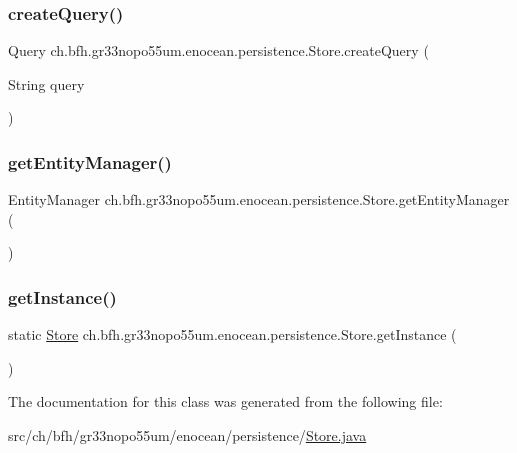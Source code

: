 \subsubsection{\texorpdfstring{create\+Query()}{createQuery()}}
{\footnotesize\ttfamily Query ch.\+bfh.\+gr33nopo55um.\+enocean.\+persistence.\+Store.\+create\+Query (\begin{DoxyParamCaption}\item[{String}]{query }\end{DoxyParamCaption})}

\hypertarget{classch_1_1bfh_1_1gr33nopo55um_1_1enocean_1_1persistence_1_1_store_a198b406b1a720a65eb6c4de3ee9a8181}{}\label{classch_1_1bfh_1_1gr33nopo55um_1_1enocean_1_1persistence_1_1_store_a198b406b1a720a65eb6c4de3ee9a8181} 
\subsubsection{\texorpdfstring{get\+Entity\+Manager()}{getEntityManager()}}
{\footnotesize\ttfamily Entity\+Manager ch.\+bfh.\+gr33nopo55um.\+enocean.\+persistence.\+Store.\+get\+Entity\+Manager (\begin{DoxyParamCaption}{ }\end{DoxyParamCaption})}

\hypertarget{classch_1_1bfh_1_1gr33nopo55um_1_1enocean_1_1persistence_1_1_store_ae60beff3d45cb4dec657876392e02471}{}\label{classch_1_1bfh_1_1gr33nopo55um_1_1enocean_1_1persistence_1_1_store_ae60beff3d45cb4dec657876392e02471} 
\subsubsection{\texorpdfstring{get\+Instance()}{getInstance()}}
{\footnotesize\ttfamily static \hyperlink{classch_1_1bfh_1_1gr33nopo55um_1_1enocean_1_1persistence_1_1_store}{Store} ch.\+bfh.\+gr33nopo55um.\+enocean.\+persistence.\+Store.\+get\+Instance (\begin{DoxyParamCaption}{ }\end{DoxyParamCaption})\hspace{0.3cm}{\ttfamily [static]}}



The documentation for this class was generated from the following file\+:\begin{DoxyCompactItemize}
\item 
src/ch/bfh/gr33nopo55um/enocean/persistence/\hyperlink{_store_8java}{Store.\+java}\end{DoxyCompactItemize}
